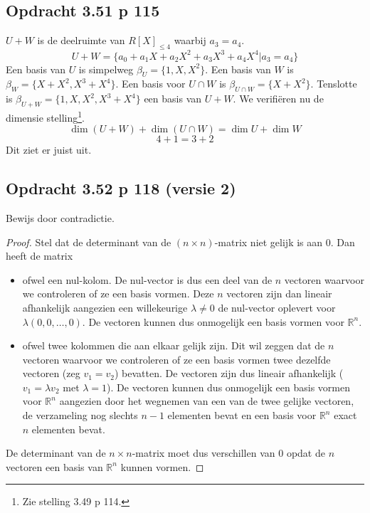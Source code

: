 \documentclass[lineaire_algebra_oplossingen.tex]{subfiles}
\begin{document}








\subsection{Opdracht 3.51 p 115}
\label{3.51}
$U+W$ is de deelruimte van $R[X]_{\le4}$ waarbij $a_3 = a_4$.
\[U+W = \{a_0 + a_1 X + a_2 X^2 +a_3 X^3 + a_4 X^4 | a_3 = a_4\}\]
Een basis van $U$ is simpelweg $\beta_U = \{1,X,X^2\}$. Een basis van $W$ is $\beta_W = \{X+X^2,X^3+X^4\}$. Een basis voor $U\cap W$ is $\beta_{U\cap W} = \{X+X^2\}$. Tenslotte is $\beta_{U+W} = \{1,X,X^2,X^3+X^4\}$ een basis van $U+W$. We verifi\"eren nu de dimensie stelling\footnote{Zie stelling 3.49 p 114.}.
\[
\dim(U+W) + \dim(U \cap W) = \dim U+\dim W
\]
\[
4 + 1 = 3+2
\]
Dit ziet er juist uit.


\subsection{Opdracht 3.52 p 118 (versie 2)}
\label{3.52}
Bewijs door contradictie.
\begin{proof}
Stel dat de determinant van de $(n\times n)$-matrix niet gelijk is aan $0$.
Dan heeft de matrix
\begin{itemize}
\item
ofwel een nul-kolom. 
De nul-vector is dus een deel van de $n$ vectoren waarvoor we controleren of ze een basis vormen.
Deze $n$ vectoren zijn dan lineair afhankelijk aangezien een willekeurige $\lambda \neq 0$ de nul-vector oplevert voor $\lambda (0, 0, \dots, 0)$.
De vectoren kunnen dus onmogelijk een basis vormen voor $\mathbb{R}^n$.

\item
ofwel twee kolommen die aan elkaar gelijk zijn.
Dit wil zeggen dat de $n$ vectoren waarvoor we controleren of ze een basis vormen twee dezelfde vectoren (zeg $v_1=v_2$) bevatten.
De vectoren zijn dus lineair afhankelijk ($v_1=\lambda v_2$ met $\lambda = 1$).
De vectoren kunnen dus onmogelijk een basis vormen voor $\mathbb{R}^n$ aangezien door het wegnemen van een van de twee gelijke vectoren, de verzameling nog slechts $n-1$ elementen bevat en een basis voor $\mathbb{R}^n$ exact $n$ elementen bevat.
\end{itemize}
De determinant van de $n\times n$-matrix moet dus verschillen van $0$ opdat de $n$ vectoren een basis van $\mathbb{R}^n$ kunnen vormen.
\end{proof}
\end{document}

